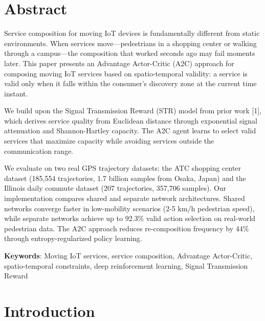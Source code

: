 \section*{Abstract}\label{abstract}

Service composition for moving IoT devices is fundamentally different
from static environments. When services move---pedestrians in a shopping
center or walking through a campus---the composition that worked seconds
ago may fail moments later. This paper presents an Advantage
Actor-Critic (A2C) approach for composing moving IoT services based on
spatio-temporal validity: a service is valid only when it falls within
the consumer's discovery zone at the current time instant.

We build upon the Signal Transmission Reward (STR) model from prior work [1], which derives service quality from Euclidean distance through exponential signal attenuation and Shannon-Hartley capacity. The A2C
agent learns to select valid services that maximize capacity while
avoiding services outside the communication range.

We evaluate on two real GPS trajectory datasets: the ATC shopping center
dataset (185,554 trajectories, 1.7 billion samples from Osaka, Japan)
and the Illinois daily commute dataset (207 trajectories, 357,706
samples). Our implementation compares shared and separate network
architectures. Shared networks converge faster in low-mobility
scenarios (2-5 km/h pedestrian speed), while separate networks achieve
up to 92.3\% valid action selection on real-world pedestrian data.
The A2C approach reduces re-composition frequency by 44\% through
entropy-regularized policy learning.

\textbf{Keywords}: Moving IoT services, service composition, Advantage
Actor-Critic, spatio-temporal constraints, deep reinforcement learning,
Signal Transmission Reward

\section{Introduction}
